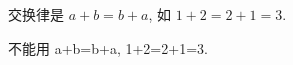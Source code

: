 \documentclass[nofonts]{ctexbook}
\begin{document}
交换律是 $a+b=b+a$, 如 $1+2=2+1=3$.

不能用 a+b=b+a, 1+2=2+1=3.
\end{document}

